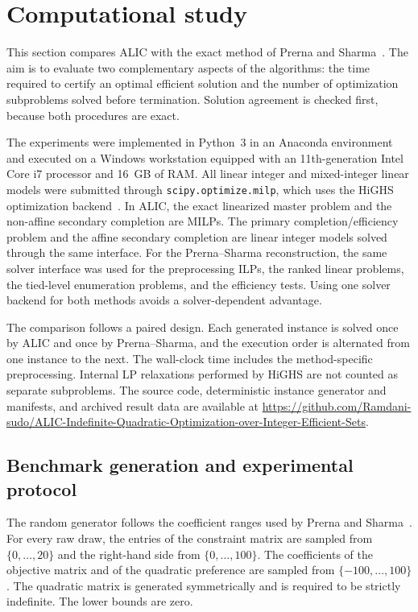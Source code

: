 \section{Computational study}
\label{sec:computational}

This section compares ALIC with the exact method of Prerna and
Sharma~\cite{prernaSharma2024}. The aim is to evaluate two complementary
aspects of the algorithms: the time required to certify an optimal efficient
solution and the number of optimization subproblems solved before
termination. Solution agreement is checked first, because both procedures
are exact.

The experiments were implemented in Python~3 in an Anaconda environment
and executed on a Windows workstation equipped with an 11th-generation
Intel Core i7 processor and 16~GB of RAM. All linear integer and
mixed-integer linear models were submitted through
\texttt{scipy.optimize.milp}, which uses the HiGHS optimization
backend~\cite{virtanen2020scipy,huangfuHall2018}. In ALIC, the exact
linearized master problem and the non-affine secondary completion are
MILPs. The primary completion/efficiency problem and the affine secondary
completion are linear integer models solved through the same interface.
For the Prerna--Sharma reconstruction, the same solver interface was used
for the preprocessing ILPs, the ranked linear problems, the tied-level
enumeration problems, and the efficiency tests. Using one solver backend
for both methods avoids a solver-dependent advantage.

The comparison follows a paired design. Each generated instance is solved
once by ALIC and once by Prerna--Sharma, and the execution order is
alternated from one instance to the next. The wall-clock time includes the
method-specific preprocessing. Internal LP relaxations performed by HiGHS
are not counted as separate subproblems. The source code, deterministic
instance generator and manifests, and archived result data are available at
\url{https://github.com/Ramdani-sudo/ALIC-Indefinite-Quadratic-Optimization-over-Integer-Efficient-Sets}.

\subsection{Benchmark generation and experimental protocol}
\label{subsec:benchmark-protocol}

The random generator follows the coefficient ranges used by Prerna and
Sharma~\cite{prernaSharma2024}. For every raw draw, the entries of the
constraint matrix are sampled from $\{0,\ldots,20\}$ and the right-hand side
from $\{0,\ldots,100\}$. The coefficients of the objective matrix and of
the quadratic preference are sampled from
$\{-100,\ldots,100\}$. The quadratic matrix is generated symmetrically and
is required to be strictly indefinite. The lower bounds are zero.


